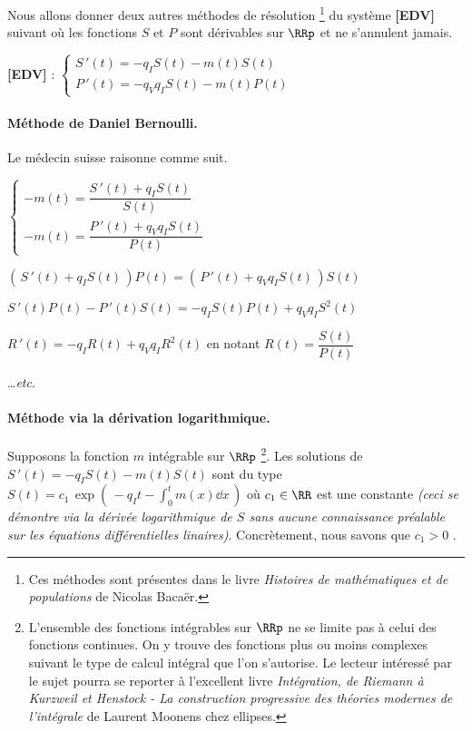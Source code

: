 Nous allons donner deux autres méthodes de résolution
\footnote{
	Ces méthodes sont présentes dans le livre \emph{\og Histoires de mathématiques et de populations \fg} de Nicolas Bacaër. 
}
du système \textbf{[EDV]} suivant où les fonctions $S$ et $P$ sont dérivables sur $\RRp$ et ne s'annulent jamais.

\medskip

\textbf{[EDV]} :
$\begin{cases}
	S\,'(t) = - q_I S(t) - m(t) S(t)     \\
	P\,'(t) = - q_V q_I S(t) - m(t) P(t)
\end{cases}$



\paragraph{Méthode de Daniel Bernoulli.} Le médecin suisse raisonne comme suit.

\medskip

$\begin{cases}
	- m(t) = \dfrac{S\,'(t) + q_I S(t)}{S(t)}     \\
	- m(t) = \dfrac{P\,'(t) + q_V q_I S(t)}{P(t)}
\end{cases}$

\medskip

$\left( \, S\,'(t) + q_I S(t) \, \right) P(t) = \left( \, P\,'(t) + q_V q_I S(t) \, \right) S(t)$

\bigskip

$S\,'(t) P(t) - P\,'(t) S(t) = - q_I S(t) P(t) + q_V q_I S^2(t)$

\medskip

$R\,'(t) = - q_I R(t) + q_V q_I R^2(t)$ en notant $R(t) = \dfrac{S(t)}{P(t)}$

\medskip

\dots \emph{etc}.





\paragraph{Méthode via la dérivation logarithmique.} Supposons la fonction $m$ intégrable sur $\RRp$
\footnote{
	L'ensemble des fonctions intégrables sur $\RRp$ ne se limite pas à celui des fonctions continues. On y trouve des fonctions plus ou moins complexes suivant le type de calcul intégral que l'on s'autorise. Le lecteur intéressé par le sujet pourra se reporter à l'excellent livre \emph{\og Intégration, de Riemann à Kurzweil et Henstock - La construction progressive des théories modernes de l'intégrale \fg} de Laurent Moonens chez ellipses. 
}.
Les solutions de $S\,'(t) = - q_I S(t) - m(t) S(t)$ sont du type $\displaystyle S(t) = c_1 \, \exp \left( \, - q_I t - \int_0^t m(x) \dd{x} \, \right)$ où $c_1 \in \RR$ est une constante \emph{(ceci se démontre via la dérivée logarithmique de $S$ sans aucune connaissance préalable sur les équations différentielles linaires)}. Concrètement, nous savons que $c_1 > 0$ .

